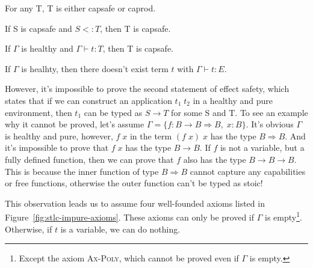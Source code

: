 \begin{lemma}
 For any T, T is either capsafe or caprod.
\end{lemma}

\begin{lemma}
 If S is capsafe and $S <: T$, then T is capsafe.
\end{lemma}

\begin{lemma}
  If $\Gamma$ is healthy and $\Gamma \vdash t : T$, then T is capsafe.
\end{lemma}

\begin{theorem}
  If $\Gamma$ is healhty, then there doesn't exist term $t$ with
  $\Gamma \vdash t : E$.
\end{theorem}

However, it's impossible to prove the second statement of effect
safety, which states that if we can construct an application
$t_1 \; t_2$ in a healthy and pure environment, then $t_1$ can be
typed as $S \to T$ for some S and T. To see an example why it cannot
be proved, let's assume
$\Gamma = \{f: B \to B \Rightarrow B, \; x: B\}$. It's obvious
$\Gamma$ is healthy and pure, however, $f \; x$ in the term
$(f \; x) \;x$ has the type $B \Rightarrow B$. And it's impossible to
prove that $f \; x$ has the type $B \to B$. If $f$ is not a variable,
but a fully defined function, then we can prove that $f$ also has the
type $B \to B \to B$. This is because the inner function of type
$B \Rightarrow B$ cannot capture any capabilities or free functions,
otherwise the outer function can't be typed as stoic!

This observation leads us to assume four well-founded axioms listed in
Figure~\ref{fig:stlc-impure-axioms}. These axioms can only be proved
if $\Gamma$ is empty\footnote{Except the axiom \textsc{Ax-Poly}, which
  cannot be proved even if $\Gamma$ is empty.}. Otherwise, if $t$ is a
variable, we can do nothing.


